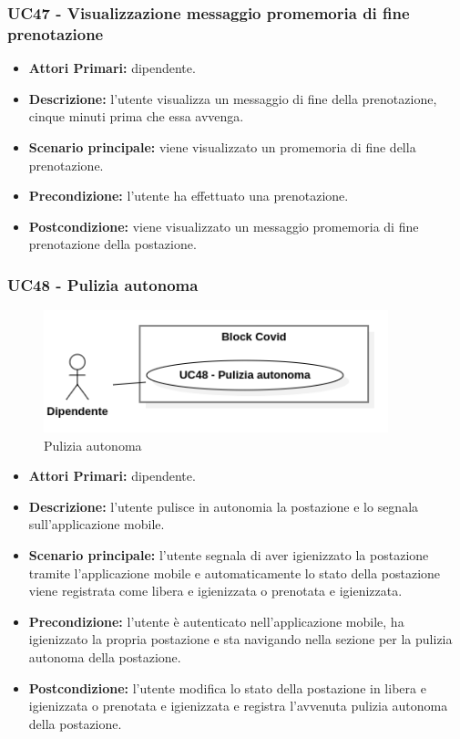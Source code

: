 \subsubsection{ UC47 - Visualizzazione messaggio promemoria di fine prenotazione}
\begin{itemize}
	\item\textbf{Attori Primari:} dipendente.
	\item\textbf{Descrizione:} l’utente visualizza un messaggio di fine della prenotazione, cinque minuti prima che essa avvenga.
	\item\textbf{Scenario principale:} viene visualizzato un promemoria di fine della prenotazione.
	\item\textbf{Precondizione:} l’utente ha effettuato una prenotazione.
	\item\textbf{Postcondizione:} viene visualizzato un messaggio promemoria di fine prenotazione della postazione.
\end{itemize}

\subsubsection{ UC48 - Pulizia autonoma}
\begin{figure}[H]
	\centering
	\includegraphics[width=10cm]{res/images/UC48.png}
	\caption{Pulizia autonoma}
	\label{fig:Pulizia autonoma}
\end{figure}
\begin{itemize}
	\item\textbf{Attori Primari:} dipendente.
	\item\textbf{Descrizione:} l’utente pulisce in autonomia la postazione e lo segnala sull'applicazione mobile. 	
	\item\textbf{Scenario principale:} l’utente segnala di aver igienizzato la postazione tramite l'applicazione mobile e automaticamente lo stato della postazione viene registrata come libera e igienizzata o prenotata e igienizzata.
	\item\textbf{Precondizione:} l’utente è autenticato nell'applicazione mobile, ha igienizzato la propria postazione e sta navigando nella sezione per la pulizia 
	autonoma della postazione.
	\item\textbf{Postcondizione:} l’utente modifica lo stato della postazione in libera e igienizzata o prenotata e igienizzata e registra l'avvenuta pulizia autonoma della postazione.
\end{itemize}

